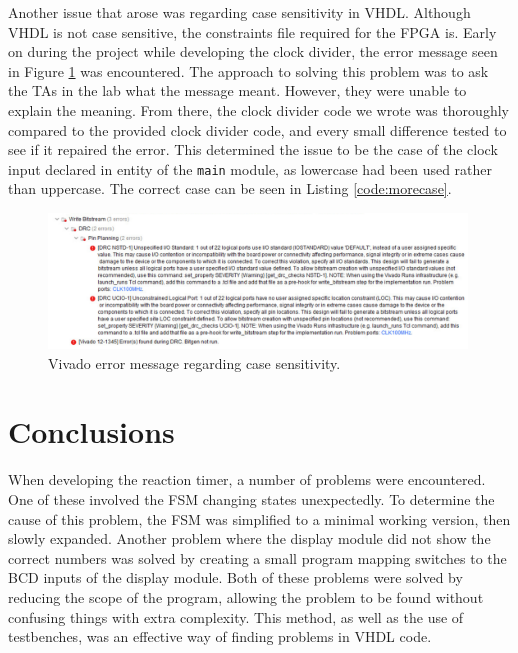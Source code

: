 \documentclass[11pt]{article}
\begin{document}
Another issue that arose was regarding case sensitivity in VHDL. Although VHDL is not case sensitive, the constraints file required for the FPGA is. Early on during the project while developing the clock divider, the error message seen in Figure \ref{fig:error} was encountered. The approach to solving this problem was to ask the TAs in the lab what the message meant. However, they were unable to explain the meaning. From there, the clock divider code we wrote was thoroughly compared to the provided clock divider code, and every small difference tested to see if it repaired the error. This determined the issue to be the case of the clock input declared in entity of the \texttt{main} module, as lowercase had been used rather than uppercase. The correct case can be seen in Listing \ref{code:morecase}.

\begin{figure}[H]
	\centering
	\includegraphics[width=0.99\textwidth]{error.png}
	\caption{Vivado error message regarding case sensitivity.}
	\label{fig:error}
\end{figure}

\section{Conclusions}


When developing the reaction timer, a number of problems were encountered. One of these involved the FSM changing states unexpectedly. To determine the cause of this problem, the FSM was simplified to a minimal working version, then slowly expanded. Another problem where the display module did not show the correct numbers was solved by creating a small program mapping switches to the BCD inputs of the display module. Both of these problems were solved by reducing the scope of the program, allowing the problem to be found without confusing things with extra complexity. This method, as well as the use of testbenches, was an effective way of finding problems in VHDL code.
\end{document}
